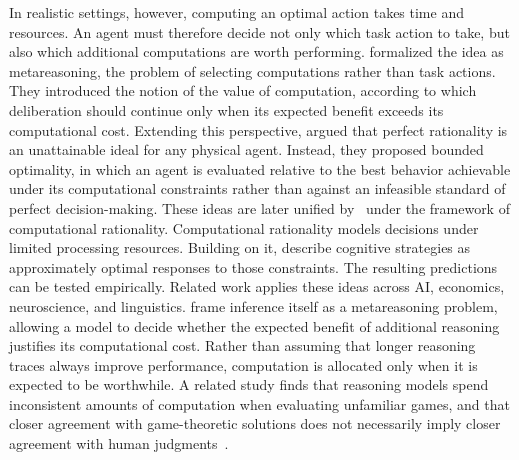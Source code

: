 \documentclass[acmsmall,screen,review,anonymous]{acmart}
\begin{document}
In realistic settings, however, computing an optimal action takes time and resources.
%
An agent must therefore decide not only which task action to take, but also which additional computations are worth performing.
%
\citet{RUSSELL1991361} formalized the idea as metareasoning, the problem of selecting computations rather than task actions.
%
They introduced the notion of the value of computation, according to which deliberation should continue only when its expected benefit exceeds its computational cost. 
%
Extending this perspective, \citet{russell1995boundedoptimal} argued that perfect rationality is an unattainable ideal for any physical agent.
%
Instead, they proposed bounded optimality, in which an agent is evaluated relative to the best behavior achievable under its computational constraints rather than against an infeasible standard of perfect decision-making.
%
These ideas are later unified by~\citet{gershman2015} under the framework of computational rationality.
%
Computational rationality models decisions under limited processing resources.
%
Building on it, \citet{Lieder_Griffiths_2020} describe cognitive strategies as approximately optimal responses to those constraints.
%
The resulting predictions can be tested empirically.
%
Related work applies these ideas across AI, economics, neuroscience, and linguistics.
%
\citet{desabbata2025rationalmetareasoninglargelanguage} frame inference itself as a metareasoning problem, allowing a model to decide whether the expected benefit of additional reasoning justifies its computational cost.
%
Rather than assuming that longer reasoning traces always improve performance, computation is allocated only when it is expected to be worthwhile.
%
A related study finds that reasoning models spend inconsistent amounts of computation when evaluating unfamiliar games, and that closer agreement with game-theoretic solutions does not necessarily imply closer agreement with human judgments~\citep{collins2026evaluating}.
\end{document}
